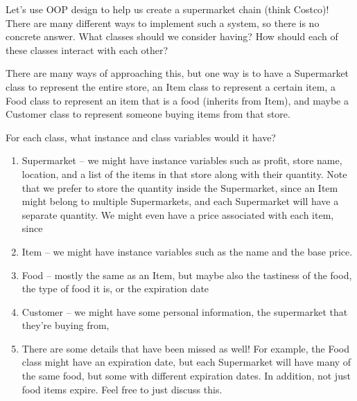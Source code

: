 \begin{blocksection}
Let's use OOP design to help us create a supermarket chain (think Costco)! There are many different ways to implement such a system, so there is no concrete answer.
\question What classes should we consider having? How should each of these classes interact with each other?
\begin{solution}[1.5in] 
There are many ways of approaching this, but one way is to have a Supermarket class to represent the entire store, an Item class to represent a certain item, a Food class to represent an item that is a food (inherits from Item), and maybe a Customer class to represent someone buying items from that store.
\end{solution}
\end{blocksection}

\begin{blocksection}
\question For each class, what instance and class variables would it have?
\begin{solution}[1.5in]
\begin{enumerate}[1.]
\item Supermarket -- we might have instance variables such as profit, store name, location, and a list of the items in that store along with their quantity. Note that we prefer to store the quantity inside the Supermarket, since an Item might belong to multiple Supermarkets, and each Supermarket will have a separate quantity. We might even have a price associated with each item, since 
\item Item -- we might have instance variables such as the name and the base price.
\item Food -- mostly the same as an Item, but maybe also the tastiness of the food, the type of food it is, or the expiration date
\item Customer -- we might have some personal information, the supermarket that they're buying from, 
\item There are some details that have been missed as well! For example, the Food class might have an expiration date, but each Supermarket will have many of the same food, but some with different expiration dates. In addition, not just food items expire. Feel free to just discuss this.
\end{enumerate}
\end{solution}
\end{blocksection}

